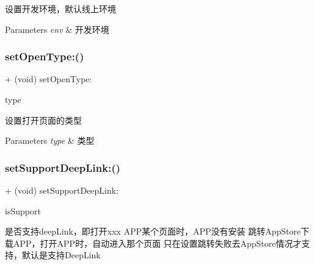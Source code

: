 设置开发环境，默认线上环境


\begin{DoxyParams}{Parameters}
{\em env} & 开发环境 \\
\hline
\end{DoxyParams}
\mbox{\label{interface_a_l_p_t_b_link_partner_s_d_k_a4461a7b64cbff06164da5991cda19c3f}} 
\subsubsection{\texorpdfstring{set\+Open\+Type\+:()}{setOpenType:()}}
{\footnotesize\ttfamily + (void) set\+Open\+Type\+: \begin{DoxyParamCaption}\item[{(A\+L\+P\+Open\+Type)}]{type }\end{DoxyParamCaption}}

设置打开页面的类型


\begin{DoxyParams}{Parameters}
{\em type} & 类型 \\
\hline
\end{DoxyParams}
\mbox{\label{interface_a_l_p_t_b_link_partner_s_d_k_a2a2c36c7f060673309257f123bb31327}} 
\subsubsection{\texorpdfstring{set\+Support\+Deep\+Link\+:()}{setSupportDeepLink:()}}
{\footnotesize\ttfamily + (void) set\+Support\+Deep\+Link\+: \begin{DoxyParamCaption}\item[{(B\+O\+OL)}]{is\+Support }\end{DoxyParamCaption}}

是否支持deep\+Link，即打开xxx A\+P\+P某个页面时，\+A\+P\+P没有安装 跳转\+App\+Store下载\+A\+P\+P，打开\+A\+P\+P时，自动进入那个页面 只在设置跳转失败去\+App\+Store情况才支持，默认是支持\+Deep\+Link


